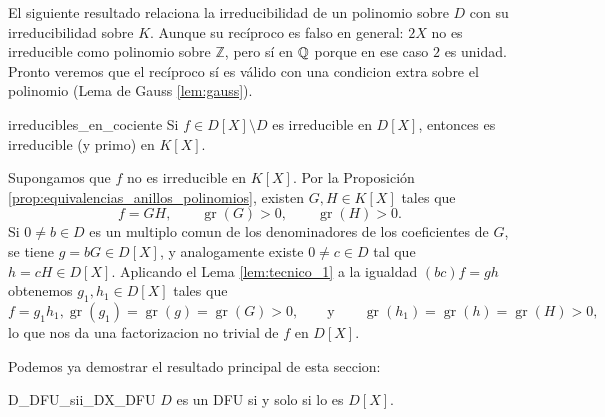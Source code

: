 El siguiente resultado relaciona la irreducibilidad de un polinomio sobre $D$ con su irreducibilidad sobre $K$. Aunque su recíproco es falso en general: $2X$ no es irreducible como polinomio sobre $\mathbb{Z}$, pero sí en $\mathbb{Q}$ porque en ese caso $2$ es unidad. Pronto veremos que el recíproco sí es válido con una condicion extra sobre el polinomio (Lema de Gauss \ref{lem:gauss}).

\begin{lemma}{}{irreducibles_en_cociente}
Si $f\in D[X]\setminus D$ es irreducible en $D[X]$, entonces es irreducible (y primo) en $K[X]$.
\end{lemma}

\begin{proofbox}
Supongamos que $f$ no es irreducible en $K[X]$. Por la Proposición \ref{prop:equivalencias_anillos_polinomios}, existen $G,H\in K[X]$ tales que
\[
f=GH,\qquad\operatorname{gr}(G)>0,\qquad\operatorname{gr}(H)>0.
\]
Si $0\neq b\in D$ es un multiplo comun de los denominadores de los coeficientes de $G$, se tiene $g=bG\in D[X]$, y analogamente existe $0\neq c\in D$ tal que $h=cH\in D[X]$. Aplicando el Lema \ref{lem:tecnico_1} a la igualdad $(bc)f=gh$ obtenemos $g_{1},h_{1}\in D[X]$ tales que 
\[
f=g_{1}h_{1}, \operatorname{gr}(g_{1}) = \operatorname{gr}(g) = \operatorname{gr}(G)>0, \qquad \text{y} \qquad \operatorname{gr}(h_{1}) = \operatorname{gr}(h) = \operatorname{gr}(H) > 0,
\]
lo que nos da una factorizacion no trivial de $f$ en $D[X]$.
\end{proofbox}

Podemos ya demostrar el resultado principal de esta seccion:

\begin{theorem}{}{D_DFU_sii_DX_DFU}
$D$ es un DFU si y solo si lo es $D[X]$.
\end{theorem}

